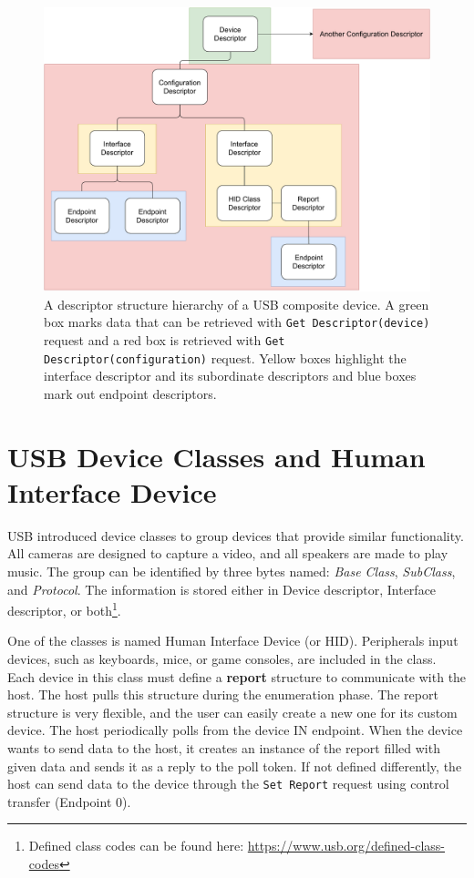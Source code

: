 \begin{figure}[ht]
    \centering
    \includegraphics[width=\linewidth]{./obrazky-figures/descriptor_layout.pdf}
    \caption{A descriptor structure hierarchy of a USB composite device. A green box marks data that can be retrieved with \texttt{Get Descriptor(device)} request and a red box is retrieved with \texttt{Get Descriptor(configuration)} request. Yellow boxes highlight the interface descriptor and its subordinate descriptors and blue boxes mark out endpoint descriptors.}
    \label{fig:descriptors}
\end{figure}

\section{USB Device Classes and Human Interface Device}
\label{sec:device_classes_and_hid}
USB introduced device classes to group devices that provide similar functionality. All cameras are designed to capture a video, and all speakers are made to play music. The group can be identified by three bytes named: \emph{Base Class}, \emph{SubClass}, and \emph{Protocol}. The information is stored either in Device descriptor, Interface descriptor, or both\footnote{Defined class codes can be found here: \url{https://www.usb.org/defined-class-codes}}.

One of the classes is named Human Interface Device (or HID). Peripherals input devices, such as keyboards, mice, or game consoles, are included in the class. Each device in this class must define a \textbf{report} structure to communicate with the host. The host pulls this structure during the enumeration phase. The report structure is very flexible, and the user can easily create a new one for its custom device. The host periodically polls from the device IN endpoint. When the device wants to send data to the host, it creates an instance of the report filled with given data and sends it as a reply to the poll token. If not defined differently, the host can send data to the device through the \verb|Set Report| request using control transfer (Endpoint 0).

